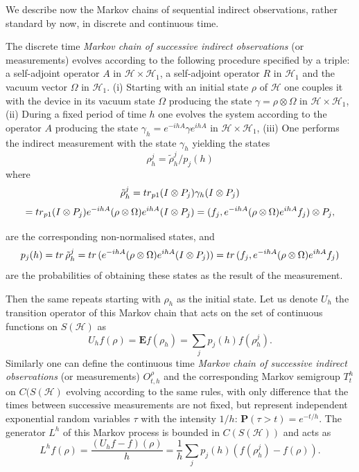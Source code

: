 \documentclass[10pt,a4paper]{amsart}
\def\HC{\mathcal{H}}
\def\E{\mathbf{E}}
\def\P{\mathbf{P}}
\def\tr{\rm{tr}}
\def\ga{\gamma}
\newcommand{\Om}{\Omega}
\begin{document}
We describe now the
Markov chains of sequential indirect observations, rather standard by now,
in discrete and continuous time.


The discrete time {\it Markov chain of successive indirect observations} (or measurements) evolves according
to the following procedure specified by a triple: a self-adjoint  operator $A$ in $\HC\times \HC_1$,
a self-adjoint operator $R$ in $\HC_1$ and the vacuum vector $\Om$ in $\HC_1$.
(i) Starting with an initial state $\rho$ of $\HC$ one couples it with the device in its vacuum state $\Om$
producing the state $\ga=\rho\otimes \Om$ in $\HC\times \HC_1$,
(ii) During a fixed period of time $h$ one evolves the system according to the operator $A$ producing the state
$\ga_h=e^{-ihA}\ga e^{ihA}$ in $\HC\times \HC_1$,
(iii) One performs the indirect measurement with the state $\ga_h$ yielding the states
\begin{equation}
\label{eqMarkchain}
\rho_h^j=\tilde \rho_h^j/ p_j(h)
\end{equation}
where
\[
\tilde \rho_h^j ={\tr}_{p1} (I\otimes P_j)\ga_h (I\otimes P_j)
\]
\begin{equation}
\label{eqMarkchain0}
={\tr}_{p1} (I\otimes P_j)e^{-ihA}(\rho\otimes \Om) e^{ihA} (I\otimes P_j)
=(f_j, e^{-ihA}(\rho\otimes \Om) e^{ihA} f_j) \otimes P_j,
\end{equation}

are the corresponding non-normalised states, and
\begin{equation}
\label{eqMarkchain1}
p_j(h)={\tr} \, \tilde \rho_h^j
={\tr} \, (e^{-ihA}(\rho\otimes \Om) e^{ihA}  (I\otimes P_j))
={\tr}\, (f_j, e^{-ihA}(\rho\otimes \Om) e^{ihA} f_j)
\end{equation}
are the probabilities of obtaining these states as the result of the measurement.

Then the same repeats starting with $\rho_h$ as the initial state.  Let us denote $U_h$ the transition
operator of this Markov chain that acts on the set of continuous functions on $S(\HC)$ as
\begin{equation}
\label{eqMarkchain2}
U_h f(\rho)=\E f(\rho_h)=\sum_j p_j(h) f(\rho_h^j).
\end{equation}
Similarly one can define the continuous time
{\it Markov chain of successive indirect observations} (or measurements)
$O^{\rho}_{t,h}$ and the corresponding Markov semigroup $T_t^h$ on $C(S(\HC)$
evolving according to the same rules, with only difference that the times between successive measurements
are not fixed, but represent independent exponential random  variables $\tau$ with
the intensity $1/h$: $\P(\tau>t)=e^{-t/h}$.
The generator $L^h$ of this Markov process is bounded in $C(S(\HC))$ and acts as
\begin{equation}
\label{eqMarkchain3}
L^hf(\rho)=\frac{(U_hf-f)(\rho)}{h}=\frac{1}{h}\sum_j p_j(h) (f(\rho_h^j)-f(\rho)).
\end{equation}
\end{document}
